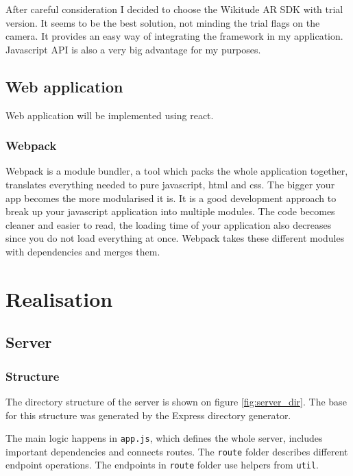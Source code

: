 \documentclass[thesis=M,english]{FITthesis}[2012/10/20]
\begin{document}
After careful consideration I decided to choose the Wikitude AR SDK with trial version. It seems to be the best solution, not minding the trial flags on the camera. It provides an easy way of integrating the framework in my application. Javascript API is also a very big advantage for my purposes.

\section{Web application}

Web application will be implemented using react. 

\subsection{Webpack}
Webpack is a module bundler, a tool which packs the whole application together, translates everything needed to pure javascript, html and css. The bigger your app becomes the more modularised it is. It is a good development approach to break up your javascript application into multiple modules. The code becomes cleaner and easier to read, the loading time of your application also decreases since you do not load everything at once. Webpack takes these different modules with dependencies and merges them.



\chapter{Realisation}

\section{Server}
\subsection{Structure}

The directory structure of the server is shown on figure \ref{fig:server_dir}. The base for this structure was generated by the Express directory generator. 

The main logic happens in \verb|app.js|, which defines the whole server, includes important dependencies and connects routes.
The \verb|route| folder describes different endpoint operations. The endpoints in \verb|route| folder use helpers from \verb|util|. 
\end{document}
